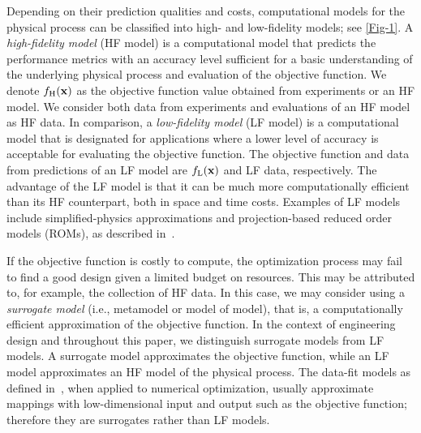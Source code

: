 \documentclass[journal ]{new-aiaa}
\begin{document}
Depending on their prediction qualities and costs, computational models for the physical process can be classified into high- and low-fidelity models; see \cref{Fig-1}.
A \textit{high-fidelity model} (HF model) is a computational model that predicts the performance metrics with an accuracy level sufficient for a basic understanding of the underlying physical process and evaluation of the objective function.
We denote $f_\text{H}(\bf x)$ as the objective function value obtained from experiments or an HF model.
We consider both data from experiments and evaluations of an HF model as HF data.
In comparison, a \textit{low-fidelity model} (LF model) is a computational model that is designated for applications where a lower level of accuracy is acceptable for evaluating the objective function.
The objective function and data from predictions of an LF model are $f_\text{L}(\bf x)$ and LF data, respectively.
The advantage of the LF model is that it can be much more computationally efficient than its HF counterpart, both in space and time costs.
Examples of LF models include simplified-physics approximations and projection-based reduced order models (ROMs), as described in~\citet{Peherstorfer2018}.

If the objective function is costly to compute, the optimization process may fail to find a good design given a limited budget on resources.
This may be attributed to, for example, the collection of HF data.
In this case, we may consider using a \textit{surrogate model} (i.e., metamodel or model of model), that is, a computationally efficient approximation of the objective function.
In the context of engineering design and throughout this paper, we distinguish surrogate models from LF models.
A surrogate model approximates the objective function, while an LF model approximates an HF model of the physical process.
The data-fit models as defined in~\citet{Peherstorfer2018}, when applied to numerical optimization, usually approximate mappings with low-dimensional input and output such as the objective function; therefore they are surrogates rather than LF models.
\end{document}
